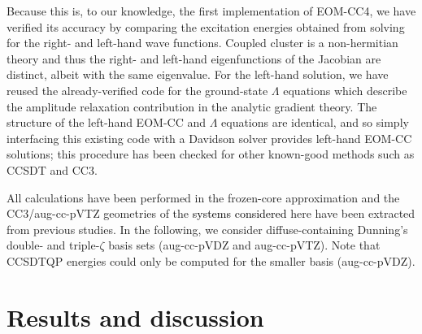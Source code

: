 \documentclass[aip,jcp,reprint,noshowkeys,superscriptaddress]{revtex4-1}
\newcommand{\alert}[1]{\textcolor{black}{#1}}
\begin{document}
Because this is, to our knowledge, the first implementation of EOM-CC4, we have verified its accuracy by comparing the excitation energies obtained from solving for the right- and left-hand wave functions. 
Coupled cluster is a non-hermitian theory and thus the right- and left-hand eigenfunctions of the Jacobian are distinct, albeit with the same eigenvalue. 
For the left-hand solution, we have reused the already-verified code for the ground-state $\Lambda$	equations which describe the amplitude relaxation contribution in the analytic gradient theory. \cite{Matthews_2021} 
The structure of the left-hand EOM-CC and $\Lambda$ equations are identical, and so simply interfacing this existing code with a Davidson solver \cite{Davidson_1975} provides left-hand EOM-CC solutions; this procedure has been checked for other known-good methods such as CCSDT and CC3.

All calculations have been performed in the frozen-core approximation and the CC3/aug-cc-pVTZ geometries of the \alert{systems considered} here have been extracted from previous studies. \cite{Loos_2018a,Chrayteh_2021}
In the following, we consider diffuse-containing Dunning's double- and triple-$\zeta$ basis sets (aug-cc-pVDZ and aug-cc-pVTZ).
Note that CCSDTQP energies could only be computed for the smaller basis (aug-cc-pVDZ).

\section{Results and discussion}
\end{document}
